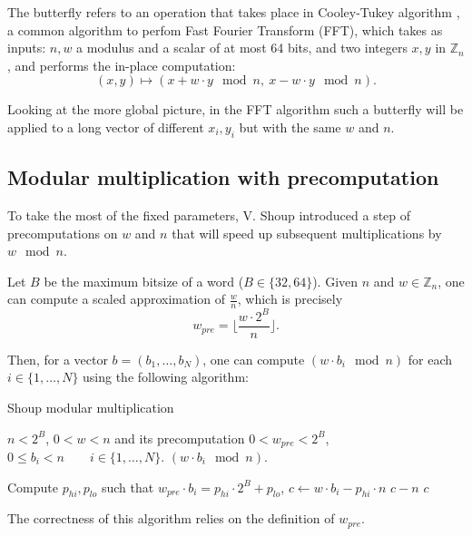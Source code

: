 \documentclass[a4paper]{article}
\begin{document}
The butterfly refers to an operation that takes place in Cooley-Tukey algorithm \cite{Cooley_Tukey_1965}, a common algorithm to perfom 
Fast Fourier Transform (FFT), which takes as inputs: $n, w$ a modulus and a scalar of at most 64 bits, and two integers 
$x, y$ in $\mathbb{Z}_n$, and performs the in-place computation:
\[
(x,y) \mapsto (x + w\cdot y \mod n,\ x - w\cdot y \mod n).
\]

Looking at the more global picture, in the FFT algorithm such a butterfly will
be applied to a long vector of different \(x_i, y_i\) but with the same \(w\) and \(n\).


\subsection{Modular multiplication with precomputation}

To take the most of the fixed parameters, V. Shoup\cite{Bos_Stam_2021} introduced a step of precomputations on $w$ and $n$ that will speed up subsequent multiplications by $w \mod n$.

\bigskip
Let $B$ be the maximum bitsize of a word ($B\in \{32, 64\}$). Given $n$ and $w \in \mathbb{Z}_n$, one can compute a scaled approximation 
of $\frac{w}{n}$, which is precisely $$ w_{pre} = \biggl\lfloor\dfrac{w\cdot 2^{B}}{n} \biggr\rfloor.$$

Then, for a vector $b = (b_1,\dots, b_N)$, one can compute $(w\cdot b_i \mod n)$ for each $i\in \{1, \dots, N\}$
using the following algorithm:

\begin{algorithm}
    \caption{Shoup modular multiplication}
    \begin{algorithmic}[1]
        \Require $n < 2^B$,
        \Require $0 < w < n$ and its precomputation $0 < w_{pre} < 2^B$,
        \Require $0 \leq b_i < n \qquad i\in \{1, \dots, N\}$.
        \Ensure $(w\cdot b_i \mod n)$.

        \State Compute $p_{hi}, p_{lo}$ such that $w_{pre} \cdot b_i = p_{hi}\cdot 2^B + p_{lo}$, 
        \State $c \gets w\cdot b_i - p_{hi}\cdot n$ 
            \State \Return $c-n$
        \Else
            \State \Return $c$
        \EndIf
    \end{algorithmic}
\end{algorithm}

\newpage
The correctness of this algorithm relies on the definition of $w_{pre}$. 
\end{document}
